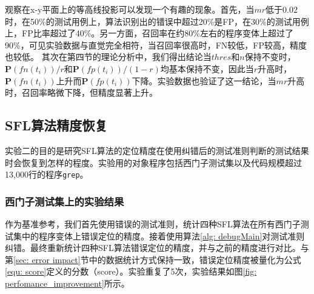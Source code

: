 观察在x-y平面上的等高线投影可以发现一个有趣的现象。首先，当$mr$低于$0.02$时，在50\%的测试用例上，算法识别出的错误中超过20\%是FP，在30\%的测试用例上，FP比率超过了40\%。另一方面，召回率在约80\%左右的程序变体上超过了90\%，可见实验数据与直觉完全相符，当召回率很高时，FN较低，FP较高，精度也较低。
其次在第四节的理论分析中，我们得出结论当$thres$和$n$保持不变时，$\mathbf{P}(fn(t_i))/r$和$\mathbf{P}(fp(t_i))/(1-r)$均基本保持不变，因此当$r$升高时，$\mathbf{P}(fn(t_i))$上升而$\mathbf{P}(fp(t_i))$下降。实验数据也验证了这一结论，当$mr$升高时，召回率略微下降，但精度显著上升。


\subsection{SFL算法精度恢复}

实验二的目的是研究SFL算法的定位精度在使用纠错后的测试准则判断的测试结果时会恢复到怎样的程度。实验用的对象程序包括西门子测试集以及代码规模超过13,000行的程序\texttt{grep}。

\subsubsection{西门子测试集上的实验结果}
作为基准参考，我们首先使用错误的测试准则，统计四种SFL算法在所有西门子测试集中的程序变体上错误定位的精度。接着使用算法\ref{alg: debugMain}对测试准则纠错。最终重新统计四种SFL算法错误定位的精度，并与之前的精度进行对比。与第\ref{sec: error impact}节中的数据统计方式保持一致，错误定位精度被量化为公式\ref{equ: score}定义的分数（score）。实验重复了5次，实验结果如图\ref{fig: perfomance_improvement}所示。

